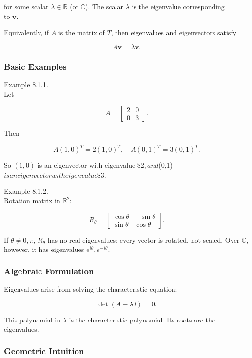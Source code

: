 \documentclass[
  12pt,
  a4paper,
]{article}
\begin{document}
for some scalar \(\lambda \in \mathbb{R}\) (or \(\mathbb{C}\)). The
scalar \(\lambda\) is the eigenvalue corresponding\\
to \(\mathbf{v}\).

Equivalently, if \(A\) is the matrix of \(T\), then eigenvalues and
eigenvectors satisfy

\[A\mathbf{v} = \lambda \mathbf{v}.\]

\subsubsection{Basic Examples}\label{basic-examples}

Example 8.1.1.\\
Let

\[A = \begin{bmatrix} 2 & 0 \\ 0 & 3 \end{bmatrix}.\]

Then

\[A(1,0)^T = 2(1,0)^T, \quad A(0,1)^T = 3(0,1)^T.\]

So \((1,0)\) is an eigenvector with eigenvalue
\$2\(, and \)(0,1)\( is an eigenvector with eigenvalue \$3\).

Example 8.1.2.\\
Rotation matrix in \(\mathbb{R}^2\):

\[R_\theta = \begin{bmatrix} \cos\theta & -\sin\theta \\ \sin\theta & \cos\theta \end{bmatrix}.\]

If \(\theta \neq 0, \pi\), \(R_\theta\) has no real eigenvalues: every
vector is rotated, not scaled. Over \(\mathbb{C}\),\\
however, it has eigenvalues \(e^{i\theta}, e^{-i\theta}\).

\subsubsection{Algebraic Formulation}\label{algebraic-formulation}

Eigenvalues arise from solving the characteristic equation:

\[\det(A - \lambda I) = 0.\]

This polynomial in \(\lambda\) is the characteristic polynomial. Its
roots are the eigenvalues.

\subsubsection{Geometric Intuition}\label{geometric-intuition}
\end{document}
